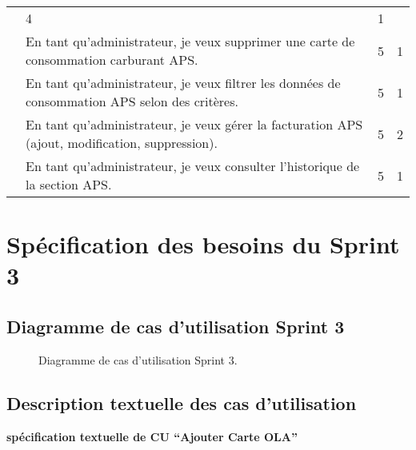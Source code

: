 \documentclass[a4paper,11pt]{report}
\begin{document}
\begin{table}[htbp]
\begin{tabular}{|p{3.5cm}|p{8cm}|c|c|}
      & 4 & 1 \\ \cline{2-4}
    & En tant qu'administrateur, je veux supprimer une carte de consommation carburant APS. 
      & 5 & 1 \\ \cline{2-4}
    & En tant qu'administrateur, je veux filtrer les données de consommation APS selon des critères. 
      & 5 & 1 \\ \cline{2-4}
    & En tant qu'administrateur, je veux gérer la facturation APS (ajout, modification, suppression). 
      & 5 & 2 \\ \cline{2-4}
    & En tant qu'administrateur, je veux consulter l’historique de la section APS. 
      & 5 & 1 \\
    \hline
  \end{tabular}
\end{table}

\section{Spécification des besoins du Sprint 3}
\subsection{Diagramme de cas d’utilisation Sprint 3}
\begin{figure}[H]
  \centering
  \setlength{\fboxrule}{1pt}
  \setlength{\fboxsep}{3pt}
  \caption{Diagramme de cas d’utilisation Sprint 3.}
  \label{fig:clone-result}
\end{figure}
\subsection{Description textuelle des cas d'utilisation}

\textbf{spécification textuelle de CU “Ajouter Carte OLA”}
\end{document}
